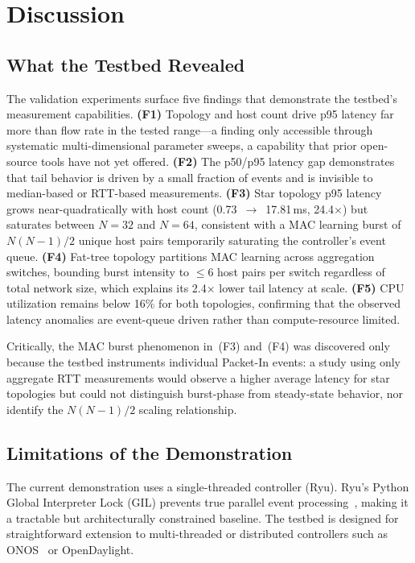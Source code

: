 \documentclass[conference]{IEEEtran}
\begin{document}
\section{Discussion}
\label{sec:discussion}

\subsection{What the Testbed Revealed}

The validation experiments surface five findings that
demonstrate the testbed's measurement capabilities.
\textbf{(F1)} Topology and host count drive p95 latency
far more than flow rate in the tested range---a finding
only accessible through systematic multi-dimensional
parameter sweeps, a capability that prior open-source tools have not yet offered.
\textbf{(F2)} The p50/p95 latency gap demonstrates that
tail behavior is driven by a small fraction of events and
is invisible to median-based or RTT-based measurements.
\textbf{(F3)} Star topology p95 latency grows
near-quadratically with host count (0.73~$\to$~17.81\,ms,
24.4$\times$) but saturates between $N{=}32$ and $N{=}64$,
consistent with a MAC learning burst of $N(N-1)/2$ unique
host pairs temporarily saturating the controller's event queue.
\textbf{(F4)} Fat-tree topology partitions MAC learning
across aggregation switches, bounding burst intensity to
${\leq}6$ host pairs per switch regardless of total
network size, which explains its 2.4$\times$ lower tail
latency at scale. \textbf{(F5)} CPU utilization remains
below 16\% for both topologies, confirming that the
observed latency anomalies are event-queue driven rather
than compute-resource limited.

Critically, the MAC burst phenomenon in~(F3) and~(F4) was
discovered only because the testbed instruments individual
Packet-In events: a study using only aggregate RTT
measurements would observe a higher average latency for
star topologies but could not distinguish burst-phase
from steady-state behavior, nor identify the $N(N-1)/2$
scaling relationship.

\subsection{Limitations of the Demonstration}

The current demonstration uses a single-threaded controller
(Ryu). Ryu's Python Global Interpreter Lock (GIL) prevents
true parallel event processing~\cite{Shalimov2013HCprobe},
making it a tractable but architecturally constrained
baseline. The testbed is designed for straightforward
extension to multi-threaded or distributed controllers
such as ONOS~\cite{Berde2014ONOS} or OpenDaylight.
\end{document}
